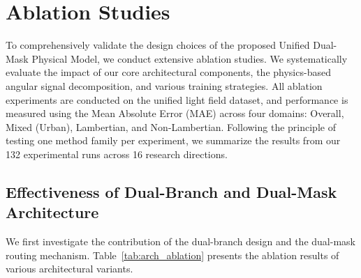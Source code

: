 \documentclass[lettersize,journal]{IEEEtran}
\begin{document}
\section{Ablation Studies}

To comprehensively validate the design choices of the proposed Unified Dual-Mask Physical Model, we conduct extensive ablation studies. We systematically evaluate the impact of our core architectural components, the physics-based angular signal decomposition, and various training strategies. All ablation experiments are conducted on the unified light field dataset, and performance is measured using the Mean Absolute Error (MAE) across four domains: Overall, Mixed (Urban), Lambertian, and Non-Lambertian. Following the principle of testing one method family per experiment, we summarize the results from our 132 experimental runs across 16 research directions.

\subsection{Effectiveness of Dual-Branch and Dual-Mask Architecture}

We first investigate the contribution of the dual-branch design and the dual-mask routing mechanism. Table~\ref{tab:arch_ablation} presents the ablation results of various architectural variants. 

\begin{table}[!t]
\centering
\caption{Ablation Study on Architectural Components and Routing Mechanisms. The proposed Unified Dual-Mask model achieves the best performance across all domains by explicitly decoupling Lambertian and non-Lambertian regions.}
\label{tab:arch_ablation}
\end{table}
\end{document}
